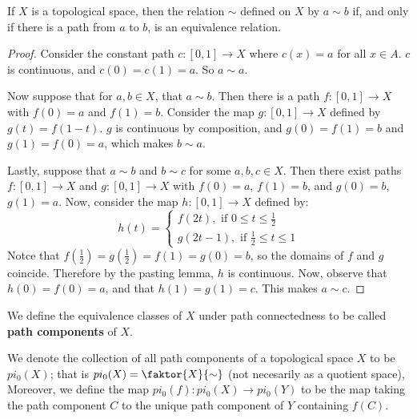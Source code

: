 \begin{theorem}\label{2.4.8}
    If $X$ is a topological space, then the relation  $\sim$ defined on  $X$ by
     $a \sim b$ if, and only if there is a path from $a$ to $b$, is an
     equivalence relation.
\end{theorem}
\begin{proof}
    Consider the constant path $c:[0,1] \xrightarrow{} X$ where $c(x)=a$ for all
    $x \in A$.  $c$ is continuous, and  $c(0)=c(1)=a$. So $a \sim a$.

    Now suppose that for  $a,b \in X$, that  $a \sim b$. Then there is a path
    $f:[0,1] \xrightarrow{} X$ with $f(0)=a$ and $f(1)=b$. Consider the map
    $g:[0,1] \xrightarrow{} X$ defined by $g(t)=f(1-t)$. $g$ is continuous by
    composition, and $g(0)=f(1)=b$ and $g(1)=f(0)=a$, which makes $b \sim a$.

    Lastly, suppose that  $a \sim b$ and  $b \sim c$ for some  $a,b,c \in X$.
    Then there exist paths  $f:[0,1] \xrightarrow{} X$ and $g:[0,1]
    \xrightarrow{} X$ with $f(0)=a$, $f(1)=b$, and $g(0)=b$, $g(1)=a$. Now,
    consider the map $h:[0,1] \xrightarrow{} X$ defined by:
    \begin{equation*}
       h(t)=\begin{cases}
                f(2t), \text{ if } 0 \leq t \leq \frac{1}{2}    \\
                g(2t-1), \text{ if } \frac{1}{2} \leq t \leq 1
            \end{cases}
    \end{equation*}
    Notce that $f(\frac{1}{2})=g(\frac{1}{2})=f(1)=g(0)=b$, so the domains of
    $f$ and  $g$ coincide. Therefore by the pasting lemma, $h$ is continuous.
    Now, observe that  $h(0)=f(0)=a$, and that $h(1)=g(1)=c$. This makes $a \sim
    c$.
\end{proof}

\begin{definition}
    We define the equivalence classes of $X$ under path connectedness to be
    called \textbf{path components} of $X$.
\end{definition}

\begin{definition}
    We denote the collection of all path components of a topological space $X$
    to be  $pi_0(X)$; that is $pi_0(X)=\faktor{X}{\sim}$ (not necesarily as a
    quotient space), Moreover, we define the map $pi_0(f):pi_0(X) \xrightarrow{}
    pi_0(Y)$ to be the map taking the path component $C$ to the unique path
    component of $Y$ containing $f(C)$.
\end{definition}


